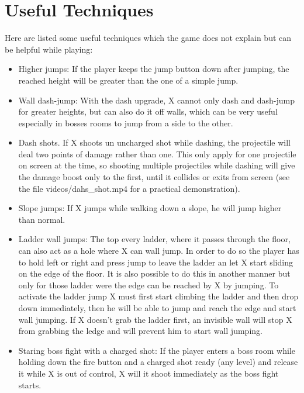 \section{Useful Techniques}
Here are listed some useful techniques which the game does not explain but can be helpful while playing\cite{RTA_wiki:X1}: %
\begin{itemize}
	\item Higher jumps: If the player keeps the jump button down after jumping, the reached height will be greater than the one of a simple jump.
	
	\item Wall dash-jump: With the dash upgrade, X cannot only dash and dash-jump for greater heights, but can also do it off walls, which can be very useful especially in bosses rooms to jump from a side to the other.
	
	\item Dash shots. If X shoots un uncharged shot while dashing, the projectile will deal two points of damage rather than one. This only apply for one projectile on screen at the time, so shooting multiple projectiles while dashing will give the damage boost only to the first, until it collides or exits from screen (see the file videos/dahs\_shot.mp4 for a practical demonstration).
	
	\item Slope jumps: If X jumps while walking down a slope, he will jump higher than normal.
	
	\item Ladder wall jumps: The top every ladder, where it passes through the floor, can also act as a hole where X can wall jump. In order to do so the player has to hold left or right and press jump to leave the ladder an let X start sliding on the edge of the floor. It is also possible to do this in another manner but only for those ladder were the edge can be reached by X by jumping. To activate the ladder jump X must first start climbing the ladder and then drop down immediately, then he will be able to jump and reach the edge and start wall jumping. If X doesn't grab the ladder first, an invisible wall will stop X from grabbing the ledge and will prevent him to start wall jumping.
	
	\item Staring boss fight with a charged shot: If the player enters a boss room while holding down the fire button and a charged shot ready (any level) and release it while X is out of control, X will it shoot immediately as the boss fight starts.
\end{itemize}

